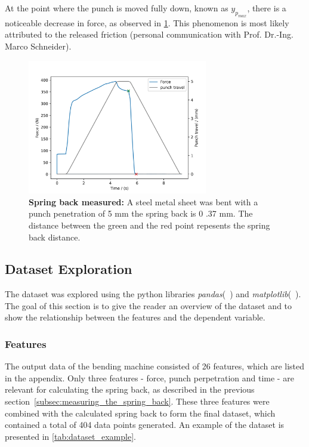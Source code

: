 At the point where the punch is moved fully down, known as $y_p_{max}$, there is a noticeable decrease in force, as
observed in \cref{fig:springback_measured}.
This phenomenon is most likely attributed to the released friction (personal communication with Prof. Dr.-Ing. Marco
Schneider).

\begin{figure}[h]
    \begin{tcolorbox}[arc=0pt,boxrule=0.5pt]
        \centering
        \includegraphics[width=0.7\textwidth]{chap4/images/t1,5_V30_y_5_1.TRA.csv_springback}
    \end{tcolorbox}
    \caption{\textbf{Spring back measured:} A steel metal sheet was bent with a punch penetration of 5
    mm the spring back is 0 .37 mm.
    The distance between the green and the red point repesents the spring back distance.}
    \label{fig:springback_measured}
\end{figure}

\subsection{Dataset Exploration}\label{subsec:dataset-exploration}
The dataset was explored using the python libraries \textit{pandas}(~\cite{mckinney-proc-scipy-2010})
and \textit{matplotlib}(~\cite{Hunter:2007}).
The goal of this section is to give the reader an overview of the dataset and
to show the relationship between the features and the dependent variable.

\subsubsection{Features}
The output data of the bending machine consisted of 26 features, which are listed in
the appendix.
Only three features - force, punch perpetration and time - are relevant for
calculating the spring back, as described in the previous section~\ref{subsec:measuring_the_spring_back}.
These three features were combined with the calculated spring back to form the final
dataset, which contained a total of 404 data points generated.
An example of the dataset is presented in \cref{tab:dataset_example}.

